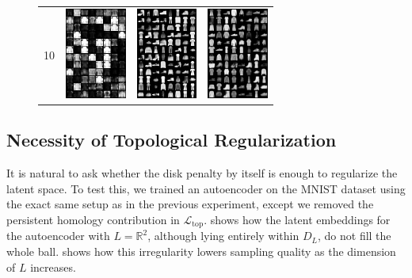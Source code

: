 \documentclass[conference]{IEEEtran}
\newcommand{\R}{\mathbb{R}}
\begin{document}
\begin{figure}[H]
\begin{tabular}{cccc}
                10 &
                \includegraphics[width=2cm]{fig/fashion-10-false.png}&
		\includegraphics[width=2cm]{fig/fashion-10-true.png}&
                \includegraphics[width=2cm]{fig/fashion-10-vae.png}
	\end{tabular}
\end{figure}

\subsection{Necessity of Topological Regularization}

It is natural to ask whether the disk penalty by itself is enough to regularize the latent space. To test this, we trained an autoencoder on the MNIST dataset using the exact same setup as in the previous experiment, except we removed the persistent homology contribution in $\mathcal{L}_{\text{top}}$.  shows how the latent embeddings for the autoencoder with $L=\R^2$, although lying entirely within $D_{L}$, do not fill the whole ball.  shows how this irregularity lowers sampling quality as the dimension of $L$ increases.
\end{document}
